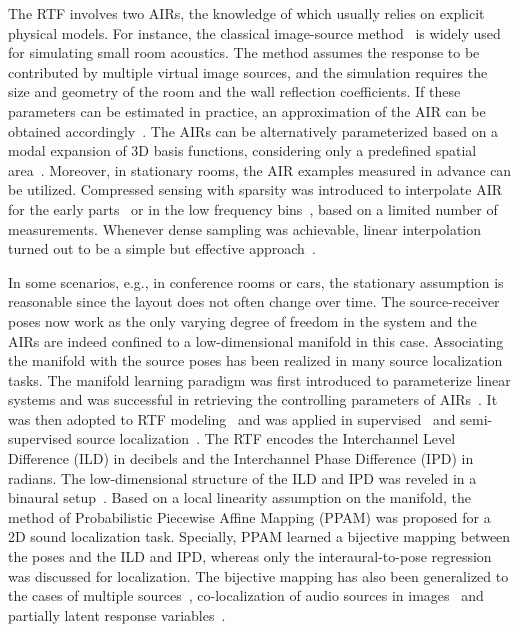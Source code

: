 \documentclass[journal]{IEEEtran}
\begin{document}
The RTF involves two AIRs, the knowledge of which usually relies on explicit physical models. For instance, the classical image-source method~\cite{allen1979image} is widely used for simulating small room acoustics. The method assumes the response to be contributed by multiple virtual image sources, and the simulation requires the size and geometry of the room and the wall reflection coefficients. If these parameters can be estimated in practice, an approximation of the AIR can be obtained accordingly~\cite{asaei2012computational,asaei2014structured}. The AIRs can be alternatively parameterized based on a modal expansion of 3D basis functions, considering only a predefined spatial area~\cite{samarasinghe2015efficient}. Moreover, in stationary rooms, the AIR examples measured in advance can be utilized. Compressed sensing with sparsity was introduced to interpolate AIR for the early parts~\cite{mignot2013room} or in the low frequency bins~\cite{mignot2014low}, based on a limited number of measurements. Whenever dense sampling was achievable, linear interpolation turned out to be a simple but effective approach~\cite{nishino1999interpolating,vincent2013second}.


In some scenarios, e.g., in conference rooms or cars, the stationary assumption is reasonable since the layout does not often change over time. The source-receiver poses now work as the only varying degree of freedom in the system and the AIRs are indeed confined to a low-dimensional manifold in this case. Associating the manifold with the source poses has been realized in many source localization tasks. The manifold learning paradigm was first introduced to parameterize linear systems and was successful in retrieving the controlling parameters of AIRs~\cite{talmon2012parametrization}. It was then adopted to RTF modeling~\cite{laufer2013relative,laufer2015study} and was applied in supervised~\cite{talmon2011supervised} and semi-supervised source localization~\cite{laufer2016mr,laufer2016semi}. The RTF encodes the Interchannel Level Difference (ILD) in decibels and the Interchannel Phase Difference (IPD) in radians. The low-dimensional structure of the ILD and IPD was reveled in a binaural setup~\cite{deleforge20122d}. Based on a local linearity assumption on the manifold, the method of Probabilistic Piecewise Affine Mapping (PPAM) was proposed for a 2D sound localization task. Specially, PPAM learned a bijective mapping between the poses and the ILD and IPD, whereas only the interaural-to-pose regression was discussed for localization. The bijective mapping has also been generalized to the cases of multiple sources~\cite{deleforge2015acoustic}, co-localization of audio sources in images~\cite{deleforge2015co} and partially latent response variables~\cite{deleforge2015high}.
\end{document}
